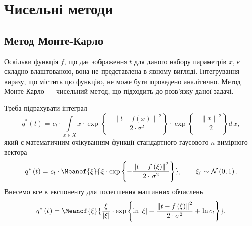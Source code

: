 \section{Чисельні методи}

\subsection{Метод Монте-Карло}

Оскільки функція $f$, що дає зображення $t$ для даного набору параметрів $x$,
є складно влаштованою, вона не представлена в явному вигляді.
Інтегрування виразу, що містить цю функцію, не може бути проведено аналітично.
Метод Монте-Карло --- чисельний метод, що підходить до розв'язку даної задачі.

Треба підрахувати інтеграл
\begin{equation*}
  q^* \left( t \right)
  = c_t
    \cdot \int\limits_{x \in X}
      x
      \cdot \exp{\left\{ - \frac{\left\| t - f\left( x \right) \right\|^2}
                                {2 \cdot \sigma^2} \right\}}
      \cdot \exp{\left\{ - \frac{\left\| x \right\|^2}{2} \right\}}
    d\,x,
\end{equation*}
який є математичним очікуванням функції
стандартного гаусового $n$-вимірного вектора
\begin{equation*}
  q^* \left( t \right)
  = c_t
    \cdot \Meanof{\xi}{
      \xi
      \cdot \exp{\left\{
          - \frac{\left\| t - f\left( \xi \right) \right\|^2}
                 {2 \cdot \sigma^2}
            \right\}}}, \qquad
    \xi_i \sim \mathcal{N}\left( 0, 1 \right).
\end{equation*}
Внесемо все в експоненту для полегшення машинних обчислень
\begin{equation*}
  q^* \left( t \right)
  = \Meanof{\xi}{
    \frac{\xi}{\left| \xi \right|}
    \cdot \exp{\left\{
        \ln{\left| \xi \right|}
        - \frac{\left\| t - f\left( \xi \right) \right\|^2}{2 \cdot \sigma^2}
        + \ln{c_t}
       \right\}
    }}.
\end{equation*}

